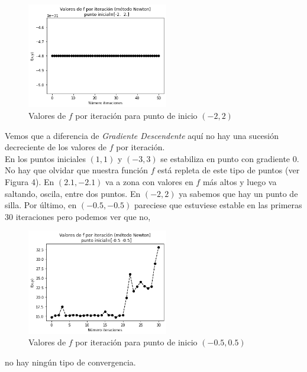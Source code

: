 \documentclass[11pt,a4paper]{article}
\theoremstyle{definition}
\begin{document}
	\begin{figure}[H]
	\centering
	\includegraphics[width=0.55\textwidth]{images/newton5}
	\caption{Valores de $f$ por iteración para punto de inicio $(-2,2)$}
	\end{figure}
	
	Vemos que a diferencia de \textit{Gradiente Descendente} aquí no hay una sucesión decreciente de los valores de $f$ por iteración. \\
	En los puntos iniciales $(1,1)$ y $(-3,3)$ se estabiliza en punto con gradiente 0. No hay que olvidar que nuestra función $f$ está repleta de este tipo de puntos (ver Figura 4). En $(2.1, -2.1)$ va a zona con valores en $f$ más altos y luego va saltando, oscila, entre dos puntos. En $(-2,2)$ ya sabemos que hay un punto de silla. Por último, en $(-0.5,-0.5)$ pareciese que estuviese estable en las primeras 30 iteraciones pero podemos ver que no,
	\begin{figure}[H]
	\centering
	\includegraphics[width=0.55\textwidth]{images/newton6}
	\caption{Valores de $f$ por iteración para punto de inicio $(-0.5,0.5)$}
	\end{figure}
	no hay ningún tipo de convergencia.\\
	
\end{document}

